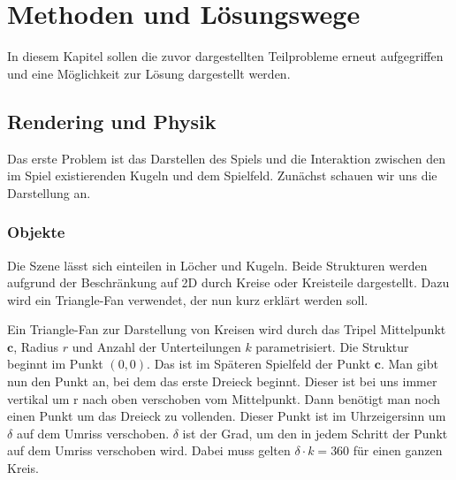 \chapter{Methoden und Lösungswege}
In diesem Kapitel sollen die zuvor dargestellten Teilprobleme erneut aufgegriffen und eine Möglichkeit zur Lösung dargestellt werden. 
\section{Rendering und Physik}
	Das erste Problem ist das Darstellen des Spiels und die Interaktion zwischen den im Spiel existierenden Kugeln und dem Spielfeld. Zunächst schauen wir uns die Darstellung an.
\subsection{Objekte}
	Die Szene lässt sich einteilen in Löcher und Kugeln. Beide Strukturen werden aufgrund der Beschränkung auf 2D durch Kreise oder Kreisteile dargestellt. Dazu wird ein Triangle-Fan verwendet, der nun kurz erklärt werden soll.
	
	Ein Triangle-Fan zur Darstellung von Kreisen wird durch das Tripel Mittelpunkt $\mathbf{c}$, Radius $r$ und Anzahl der Unterteilungen $k$ parametrisiert. 
	Die Struktur beginnt im Punkt $(0,0)$.
	Das ist im Späteren Spielfeld der Punkt $\mathbf{c}$.
	Man gibt nun den Punkt an, bei dem das erste Dreieck beginnt. Dieser ist bei uns immer vertikal um r nach oben verschoben vom Mittelpunkt. Dann benötigt man noch einen Punkt um das Dreieck zu vollenden. Dieser Punkt ist im Uhrzeigersinn um $\delta$ auf dem Umriss verschoben. 
	$\delta$ ist der Grad, um den in jedem Schritt der Punkt auf dem Umriss verschoben wird. 
	Dabei muss gelten $\delta \cdot k = 360$ für einen ganzen Kreis.

